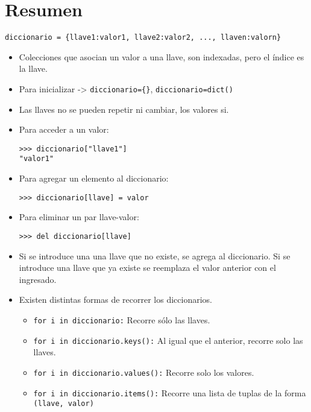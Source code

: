 \section*{Resumen}

\texttt{diccionario = \{llave1:valor1, llave2:valor2, ..., llaven:valorn\}}

\begin{itemize}
    \item Colecciones que asocian un valor a una llave, son indexadas, pero el índice es la llave.
    \item Para inicializar -> \texttt{diccionario=\{\}}, \texttt{diccionario=dict()}
    \item Las llaves no se pueden repetir ni cambiar, los valores si.
    \item Para acceder a un valor:
\begin{lstlisting}[style=consola]
>>> diccionario["llave1"]
"valor1"
\end{lstlisting}

    \item Para agregar un elemento al diccionario:
\begin{lstlisting}[style=consola]
>>> diccionario[llave] = valor
\end{lstlisting}

    \item Para eliminar un par llave-valor:
\begin{lstlisting}[style=consola]
>>> del diccionario[llave]
\end{lstlisting}

    \item Si se introduce una una llave que no existe, se agrega al diccionario. Si se introduce una llave que ya existe se reemplaza el valor anterior con el ingresado.
    
    \item Existen distintas formas de recorrer los diccionarios.
    
    \begin{itemize}
        \item \texttt{for i in diccionario:} Recorre sólo las llaves.
        \item \texttt{for i in diccionario.keys():} Al igual que el anterior, recorre solo las llaves.
        \item \texttt{for i in diccionario.values():} Recorre solo los valores.
        \item \texttt{for i in diccionario.items():} Recorre una lista de tuplas de la forma \texttt{(llave, valor)}
    \end{itemize}
    
\end{itemize}
